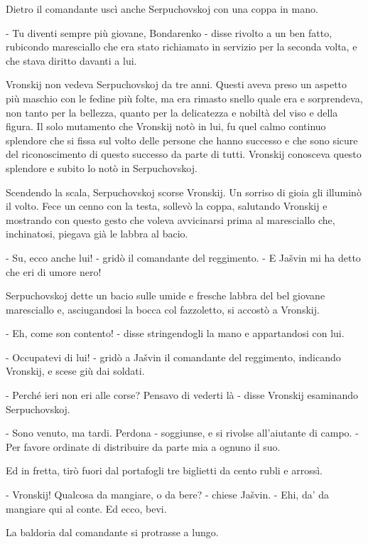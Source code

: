 Dietro il comandante uscì anche Serpuchovskoj con una coppa in mano. 

- Tu diventi sempre più giovane, Bondarenko - disse rivolto a un ben fatto, rubicondo maresciallo che era stato richiamato in servizio per la seconda volta, e che stava diritto davanti a lui. 

Vronskij non vedeva Serpuchovskoj da tre anni. Questi aveva preso un aspetto più maschio con le fedine più folte, ma era rimasto snello quale era e sorprendeva, non tanto per la bellezza, quanto per la delicatezza e nobiltà del viso e della figura. Il solo mutamento che Vronskij notò in lui, fu quel calmo continuo splendore che si fissa sul volto delle persone che hanno successo e che sono sicure del riconoscimento di questo successo da parte di tutti. Vronskij conosceva questo splendore e subito lo notò in Serpuchovskoj. 

Scendendo la scala, Serpuchovskoj scorse Vronskij. Un sorriso di gioia gli illuminò il volto. Fece un cenno con la testa, sollevò la coppa, salutando Vronskij e mostrando con questo gesto che voleva avvicinarsi prima al maresciallo che, inchinatosi, piegava già le labbra al bacio. 

- Su, ecco anche lui! - gridò il comandante del reggimento. - E Jašvin mi ha detto che eri di umore nero! 

Serpuchovskoj dette un bacio sulle umide e fresche labbra del bel giovane maresciallo e, asciugandosi la bocca col fazzoletto, si accostò a Vronskij. 

- Eh, come son contento! - disse stringendogli la mano e appartandosi con lui. 

- Occupatevi di lui! - gridò a Jašvin il comandante del reggimento, indicando Vronskij, e scese giù dai soldati. 

- Perché ieri non eri alle corse? Pensavo di vederti là - disse Vronskij esaminando Serpuchovskoj. 

- Sono venuto, ma tardi. Perdona - soggiunse, e si rivolse all'aiutante di campo. - Per favore ordinate di distribuire da parte mia a ognuno il suo. 

Ed in fretta, tirò fuori dal portafogli tre biglietti da cento rubli e arrossì. 

- Vronskij! Qualcosa da mangiare, o da bere? - chiese Jašvin. - Ehi, da' da mangiare qui al conte. Ed ecco, bevi. 

La baldoria dal comandante si protrasse a lungo. 

